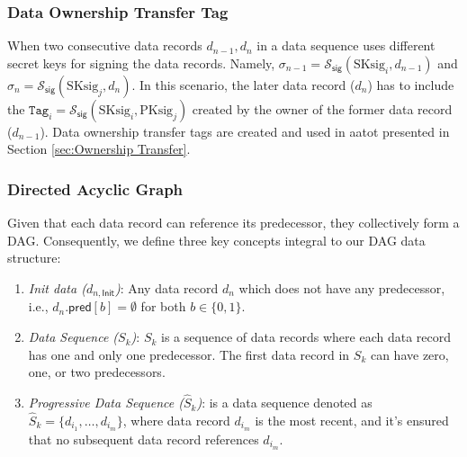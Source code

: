\subsubsection{Data Ownership Transfer Tag} 
\label{sec:Data ownership transfer tag}

When two consecutive data records $d_{n-1}, d_n$ in a data sequence uses different secret keys for signing the data records. Namely, $\sigma_{n-1} = \mathcal{S}_\mathsf{sig}(\text{SKsig}_i, d_{n-1})$ and $\sigma_n = \mathcal{S}_\mathsf{sig}(\text{SKsig}_j, d_n)$. In this scenario, the later data record ($d_n$) has to include the $\texttt{Tag}_i = \mathcal{S}_\mathsf{sig}(\text{SKsig}_i, \text{PKsig}_j)$ created by the owner of the former data record ($d_{n-1}$). Data ownership transfer tags are created and used in \gls{aatot} presented in Section \ref{sec:Ownership Transfer}.


\subsubsection{Directed Acyclic Graph}
Given that each data record can reference its predecessor, they collectively form a DAG. Consequently, we define three key concepts integral to our DAG data structure:
\begin{enumerate}
    \item \textit{Init data ($d_{n, \mathsf{Init}}$)}: Any data record $d_n$ which does not have any predecessor, i.e., $d_n.\mathsf{pred}[b] = \emptyset$ for both ${b \in \{0, 1\}}$. %

    \item \textit{Data Sequence ($S_k$)}: $S_k$ is a sequence of data records where each data record has one and only one predecessor. The first data record in $S_k$ can have zero, one, or two predecessors. %

    \item \textit{Progressive Data Sequence ($\hat{S}_k$)}: is a data sequence denoted as $\hat{S}_k = \{d_{i_1}, \dots, d_{i_m}\}$, where data record $d_{i_m}$ is the most recent, and it's ensured that no subsequent data record references $d_{i_m}$.

\end{enumerate}






